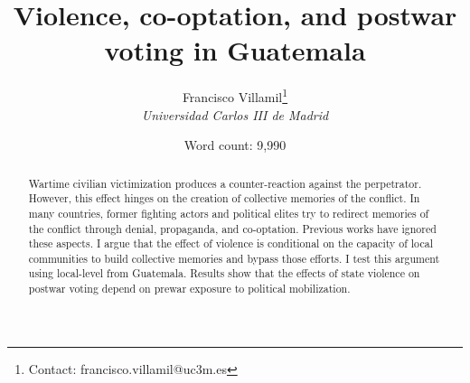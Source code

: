 \documentclass[12pt, notitlepage]{article}
\title{\Large Violence, co-optation, and postwar voting in Guatemala}
\author{Francisco Villamil\footnote{Contact: francisco.villamil@uc3m.es}\\\textit{Universidad Carlos III de Madrid}}
\date{Word count: 9,990}
\begin{document}
\maketitle
\thispagestyle{empty}

\vspace{30pt}

\begin{abstract}

Wartime civilian victimization produces a counter-reaction against the perpetrator. However, this effect hinges on the creation of collective memories of the conflict. In many countries, former fighting actors and political elites try to redirect memories of the conflict through denial, propaganda, and co-optation. Previous works have ignored these aspects. I argue that the effect of violence is conditional on the capacity of local communities to build collective memories and bypass those efforts. I test this argument using local-level from Guatemala. Results show that the effects of state violence on postwar voting depend on prewar exposure to political mobilization.

\end{abstract}
\end{document}
